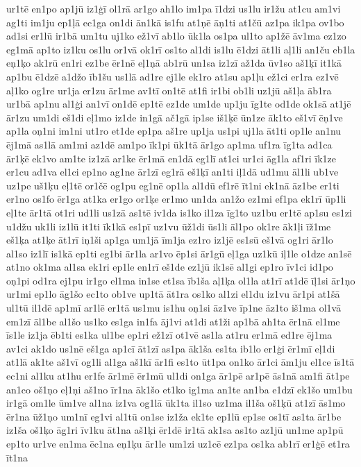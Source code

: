 {ur1tē
en1po
ap1jū
iz1ģī
ol1rā
ar1go
ah1lo
im1pa
ī1dzi
us1lu
ir1žu
at1cu
am1vi
ag1ti
im1ju
ep1ļā
ec1ga
on1di
ān1kā
is1fu
at1ņē
āņ1ti
at1čū
az1pa
ik1pa
ov1bo
ad1si
er1lū
ir1bā
um1tu
uj1ko
ež1vī
ab1lo
ūk1la
os1pa
ul1to
ap1žē
āv1ma
ez1zo
eg1mā
ap1to
iz1ku
os1lu
or1vā
ok1rī
os1to
al1di
is1lu
ē1dzi
āt1li
aļ1li
an1ču
eb1la
eņ1ķo
ak1rū
en1ri
ez1be
ēr1nē
eļ1ņā
ab1rū
un1sa
iz1zī
až1da
ūv1so
aš1ķī
it1kā
ap1bu
ē1dzē
a1džo
īb1šu
us1lā
ad1re
ej1le
ek1ro
at1su
ap1ļu
ež1ci
er1ra
ez1vē
aļ1ko
og1re
ur1ja
er1zu
ār1me
av1tī
on1tē
at1fi
ir1bi
ob1li
uz1jū
aš1ļa
āb1ra
ur1bā
ap1nu
al1ģi
an1vī
on1dē
ep1tē
ez1de
um1de
up1ju
īg1te
od1de
ok1sā
at1jē
ār1zu
um1di
eš1di
eļ1mo
iz1de
in1gā
ač1gā
ip1se
iš1ķē
ūn1ze
āk1to
eš1vī
ēņ1ve
ap1la
oņ1ni
im1ni
ut1ro
et1de
ep1pa
aš1re
up1ja
us1pi
uj1la
āt1ti
op1le
an1nu
ēj1mā
as1lā
am1mi
az1dē
am1po
īk1pi
ūk1tā
ār1go
ap1ma
uf1ra
īg1ta
ad1ca
ār1ķē
ek1vo
am1te
iz1zā
ar1ke
ēr1mā
en1dā
eg1lī
at1ci
ur1ci
āg1la
af1ri
īk1ze
er1cu
ad1va
el1ci
ep1no
ag1ne
ār1zī
eg1rā
eš1ķī
an1ti
iļ1dā
ud1mu
āl1li
ub1ve
uz1pe
uš1ķu
eļ1tē
or1čē
og1pu
eg1nē
op1la
al1dū
ef1rē
īt1ni
ek1nā
āz1be
er1ti
er1no
os1fo
ēr1ga
at1ka
er1go
or1ķe
er1mo
un1da
an1žo
ez1mi
ef1pa
ek1rī
ūp1li
eļ1te
ār1tā
ot1ri
ud1li
us1zā
as1tē
iv1da
is1ko
il1za
īg1to
uz1bu
er1tē
ap1su
es1zi
u1džu
uk1li
iz1lū
it1ti
īk1kā
es1pī
uz1vu
ūž1di
ūs1li
āl1po
ok1re
āk1ļi
īž1me
eš1ķa
at1ķe
āt1rī
iņ1ši
ap1ga
um1jā
īm1ja
ez1ro
iz1jē
es1sū
eš1vā
og1ri
ār1lo
al1so
iz1lī
is1kā
ep1ti
eg1bi
ār1la
ar1vo
ēp1si
ār1gū
eļ1ga
uz1kū
iļ1le
o1dze
an1sē
at1no
ok1ma
al1sa
ek1ri
ep1le
en1rī
eš1de
ez1jū
ik1sē
al1gi
ep1ro
īv1ci
id1po
oņ1pi
od1ra
ej1pu
ir1go
el1ma
in1se
et1sa
īb1ša
aļ1ķa
ol1la
at1rī
at1dē
īļ1si
ār1ņo
ur1mi
ep1lo
āg1šo
ec1to
ob1ve
up1tā
āt1ra
os1ko
al1zi
el1du
iz1vu
ār1pi
at1šā
ul1tū
il1dē
ap1mī
ar1lē
er1tā
us1mu
is1hu
oņ1si
āz1ve
īp1ne
āz1to
iš1ma
ol1vā
em1zī
āl1be
al1šo
us1ko
es1ga
in1fa
āj1vi
at1di
at1ži
ap1bā
ah1ta
ēr1nā
el1me
īs1le
iz1ja
ēb1ti
es1ka
ul1be
ep1ri
ež1zī
ot1vē
as1la
at1ru
er1mā
ed1re
ēj1ma
av1ci
ak1do
us1nē
eš1ga
ap1cī
āt1zī
as1pa
āk1ša
es1ta
ib1lo
er1ģi
ēr1mī
eļ1di
at1lā
ak1te
aš1vī
og1li
al1ga
aš1kī
ār1fi
es1to
ūt1pa
on1ko
ār1ci
ām1ju
el1ce
īs1tā
ec1ni
al1ku
at1hu
er1fe
ār1mē
ēr1mū
ul1di
on1ga
ār1pē
ar1pē
ās1nā
am1fi
āt1pe
an1co
oš1ņo
eļ1ņi
aš1no
īr1na
āk1šo
et1ko
ig1ma
an1te
an1ba
e1dzī
ek1šo
um1bu
ir1gā
om1le
ūm1ve
al1na
iz1va
og1lā
ūk1ta
il1so
uz1ma
il1ša
oš1ķū
at1zī
ās1mo
ēr1na
ūž1ņo
um1nī
eg1vi
al1tū
on1se
iz1ža
ek1te
ep1lū
ep1se
os1tī
as1ta
ār1be
iz1ša
oš1ķo
āg1ri
īv1ku
āt1na
aš1ķi
ēr1dē
ir1tā
ak1sa
as1to
az1jū
un1me
ap1pū
ep1to
ur1ve
en1ma
ēc1na
eņ1ķu
ār1le
um1zi
uz1cē
ez1pa
os1ka
ab1rī
er1ģē
et1ra
īt1na
}
